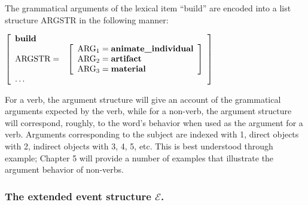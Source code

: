 The grammatical arguments of the lexical item ``build'' are encoded into a list structure ARGSTR in the following manner:
\par\vspace{5mm}
$\left[
\begin{array}{l l}
\textbf{build} & \\
\text{ARGSTR} = & \left[ \begin{array}{l}
				\text{ARG}_1=\textbf{animate\_individual} \\
				\text{ARG}_2=\textbf{artifact} \\
				\text{ARG}_3=\textbf{material}
				\end{array}\right] \\
\mathellipsis &
\end{array}
\right]$
\par\vspace{5mm}
\noindent For a verb, the argument structure will give an account of the grammatical arguments expected by the verb, while for a non-verb, the argument structure will correspond, roughly, to the word's behavior when used as the argument for a verb. Arguments corresponding to the subject are indexed with 1, direct objects with 2, indirect objects with 3, 4, 5, etc. This is best understood through example; Chapter 5 will provide a number of examples that illustrate the argument behavior of non-verbs.

\subsubsection{The extended event structure $\mathcal{E}$.}


